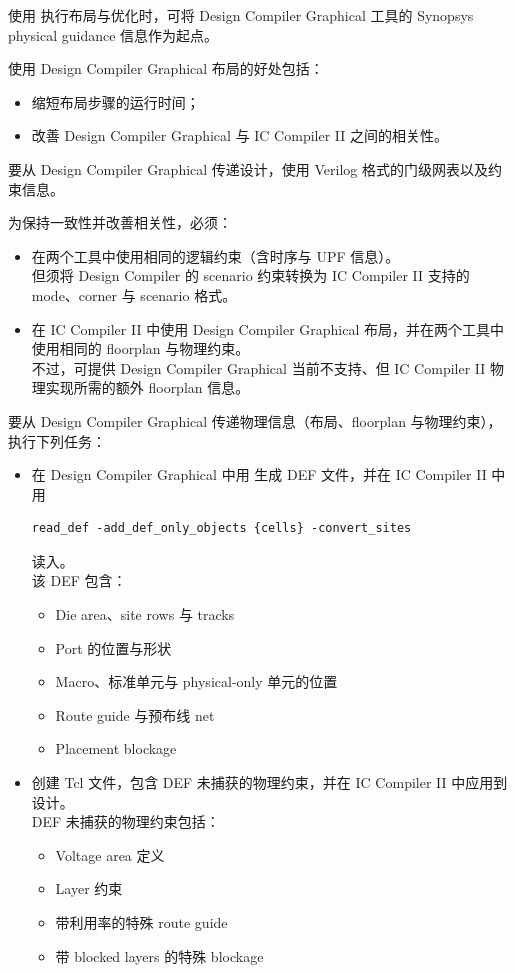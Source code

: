 使用  执行布局与优化时，可将 Design Compiler Graphical 工具的 Synopsys physical guidance 信息作为起点。

使用 Design Compiler Graphical 布局的好处包括：
\begin{itemize}
  \item 缩短布局步骤的运行时间；
  \item 改善 Design Compiler Graphical 与 IC Compiler II 之间的相关性。
\end{itemize}

要从 Design Compiler Graphical 传递设计，使用 Verilog 格式的门级网表以及约束信息。

为保持一致性并改善相关性，必须：
\begin{itemize}
  \item 在两个工具中使用相同的逻辑约束（含时序与 UPF 信息）。\\
        但须将 Design Compiler 的 scenario 约束转换为 IC Compiler II 支持的 mode、corner 与 scenario 格式。
  \item 在 IC Compiler II 中使用 Design Compiler Graphical 布局，并在两个工具中使用相同的 floorplan 与物理约束。\\
        不过，可提供 Design Compiler Graphical 当前不支持、但 IC Compiler II 物理实现所需的额外 floorplan 信息。
\end{itemize}

要从 Design Compiler Graphical 传递物理信息（布局、floorplan 与物理约束），执行下列任务：
\begin{itemize}
  \item 在 Design Compiler Graphical 中用  生成 DEF 文件，并在 IC Compiler II 中用
\begin{lstlisting}
read_def -add_def_only_objects {cells} -convert_sites
\end{lstlisting}
        读入。\\
        该 DEF 包含：
        \begin{itemize}
          \item Die area、site rows 与 tracks
          \item Port 的位置与形状
          \item Macro、标准单元与 physical-only 单元的位置
          \item Route guide 与预布线 net
          \item Placement blockage
        \end{itemize}
  \item 创建 Tcl 文件，包含 DEF 未捕获的物理约束，并在 IC Compiler II 中应用到设计。\\
        DEF 未捕获的物理约束包括：
        \begin{itemize}
          \item Voltage area 定义
          \item Layer 约束
          \item 带利用率的特殊 route guide
          \item 带 blocked layers 的特殊 blockage
        \end{itemize}
\end{itemize}

